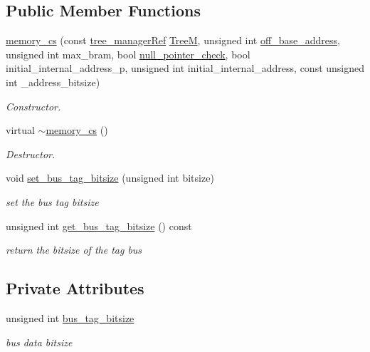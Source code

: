 \subsection*{Public Member Functions}
\begin{DoxyCompactItemize}
\item 
\hyperlink{classmemory__cs_a8f81c2988497f1879527bdb4c37628b4}{memory\+\_\+cs} (const \hyperlink{tree__manager_8hpp_a96ff150c071ce11a9a7a1e40590f205e}{tree\+\_\+manager\+Ref} \hyperlink{classmemory_a6806f41edbd2ce52a84c3ba452d011f3}{TreeM}, unsigned int \hyperlink{classmemory_ac97a5cf7a49915e6ca63883c30c0e599}{off\+\_\+base\+\_\+address}, unsigned int max\+\_\+bram, bool \hyperlink{classmemory_af76a7dbf11a240c8f8664444295701aa}{null\+\_\+pointer\+\_\+check}, bool initial\+\_\+internal\+\_\+address\+\_\+p, unsigned int initial\+\_\+internal\+\_\+address, const unsigned int \+\_\+address\+\_\+bitsize)
\begin{DoxyCompactList}\small\item\em Constructor. \end{DoxyCompactList}\item 
virtual \hyperlink{classmemory__cs_a380ae0b25722fddb38538e1db98e003c}{$\sim$memory\+\_\+cs} ()
\begin{DoxyCompactList}\small\item\em Destructor. \end{DoxyCompactList}\item 
void \hyperlink{classmemory__cs_a17c82e4db2eb296e34f91cf53132c116}{set\+\_\+bus\+\_\+tag\+\_\+bitsize} (unsigned int bitsize)
\begin{DoxyCompactList}\small\item\em set the bus tag bitsize \end{DoxyCompactList}\item 
unsigned int \hyperlink{classmemory__cs_ab4f7406402085794bdc30bddd803a5ce}{get\+\_\+bus\+\_\+tag\+\_\+bitsize} () const
\begin{DoxyCompactList}\small\item\em return the bitsize of the tag bus \end{DoxyCompactList}\end{DoxyCompactItemize}
\subsection*{Private Attributes}
\begin{DoxyCompactItemize}
\item 
unsigned int \hyperlink{classmemory__cs_a675f8fd3c82e00d105ceb0b38e121819}{bus\+\_\+tag\+\_\+bitsize}
\begin{DoxyCompactList}\small\item\em bus data bitsize \end{DoxyCompactList}\end{DoxyCompactItemize}
